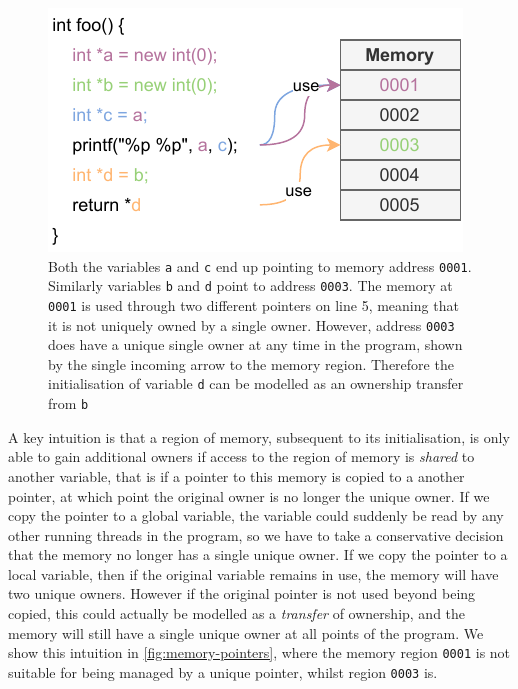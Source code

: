 \documentclass{mpaper}
\begin{document}
    \begin{figure}
        \centering
        \includegraphics[scale=1.0]{images/memory.pdf}
        \caption{Both the variables \texttt{a} and \texttt{c} end up pointing to memory address \texttt{0001}. Similarly variables \texttt{b} and \texttt{d} point to address \texttt{0003}. The memory at \texttt{0001} is used through two different pointers on line 5, meaning that it is not uniquely owned by a single owner. However, address \texttt{0003} does have a unique single owner at any time in the program, shown by the single incoming arrow to the memory region. Therefore the initialisation of variable \texttt{d} can be modelled as an ownership transfer from \texttt{b}}
        \label{fig:memory-pointers}
    \end{figure} 
    
    A key intuition is that a region of memory, subsequent to its initialisation, is only able to gain additional owners if access to the region of memory is \emph{shared} to another variable, that is if a pointer to this memory is copied to a another pointer, at which point the original owner is no longer the unique owner.
    If we copy the pointer to a global variable, the variable could suddenly be read by any other running threads in the program, so we have to take a conservative decision that the memory no longer has a single unique owner.
    If we copy the pointer to a local variable, then if the original variable remains in use, the memory will have two unique owners. 
    However if the original pointer is not used beyond being copied, this could actually be modelled as a \emph{transfer} of ownership, and the memory will still have a single unique owner at all points of the program. 
    We show this intuition in \autoref{fig:memory-pointers}, where the memory region \texttt{0001} is not suitable for being managed by a unique pointer, whilst region \texttt{0003} is.
    
\end{document}
